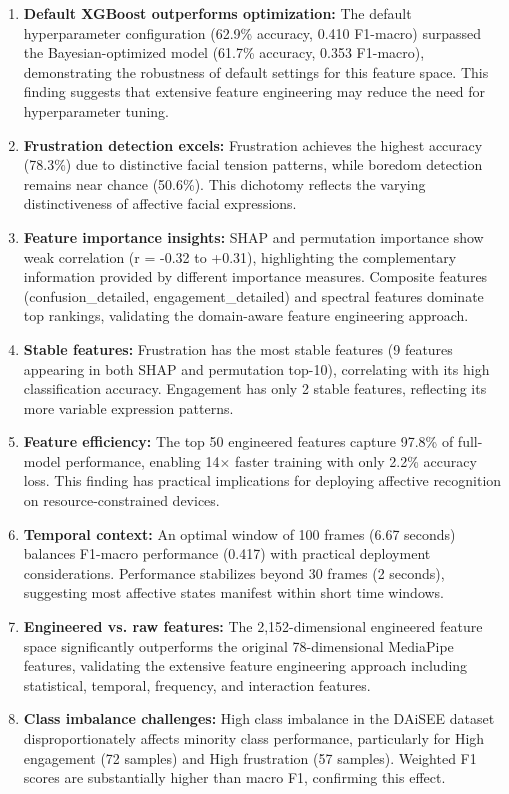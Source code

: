 \begin{enumerate}
    \item \textbf{Default XGBoost outperforms optimization:} The default hyperparameter configuration (62.9\% accuracy, 0.410 F1-macro) surpassed the Bayesian-optimized model (61.7\% accuracy, 0.353 F1-macro), demonstrating the robustness of default settings for this feature space. This finding suggests that extensive feature engineering may reduce the need for hyperparameter tuning.

    \item \textbf{Frustration detection excels:} Frustration achieves the highest accuracy (78.3\%) due to distinctive facial tension patterns, while boredom detection remains near chance (50.6\%). This dichotomy reflects the varying distinctiveness of affective facial expressions.

    \item \textbf{Feature importance insights:} SHAP and permutation importance show weak correlation (r = -0.32 to +0.31), highlighting the complementary information provided by different importance measures. Composite features (confusion\_detailed, engagement\_detailed) and spectral features dominate top rankings, validating the domain-aware feature engineering approach.
    
    \item \textbf{Stable features:} Frustration has the most stable features (9 features appearing in both SHAP and permutation top-10), correlating with its high classification accuracy. Engagement has only 2 stable features, reflecting its more variable expression patterns.

    \item \textbf{Feature efficiency:} The top 50 engineered features capture 97.8\% of full-model performance, enabling 14$\times$ faster training with only 2.2\% accuracy loss. This finding has practical implications for deploying affective recognition on resource-constrained devices.

    \item \textbf{Temporal context:} An optimal window of 100 frames (6.67 seconds) balances F1-macro performance (0.417) with practical deployment considerations. Performance stabilizes beyond 30 frames (2 seconds), suggesting most affective states manifest within short time windows.

    \item \textbf{Engineered vs. raw features:} The 2,152-dimensional engineered feature space significantly outperforms the original 78-dimensional MediaPipe features, validating the extensive feature engineering approach including statistical, temporal, frequency, and interaction features.
    
    \item \textbf{Class imbalance challenges:} High class imbalance in the DAiSEE dataset disproportionately affects minority class performance, particularly for High engagement (72 samples) and High frustration (57 samples). Weighted F1 scores are substantially higher than macro F1, confirming this effect.
\end{enumerate}

